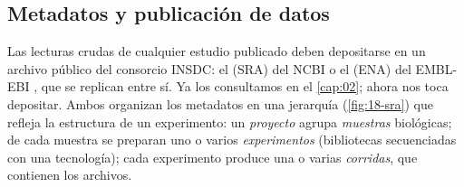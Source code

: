 \subsection{Metadatos y publicación de datos}

Las lecturas crudas de cualquier estudio publicado deben depositarse en un archivo público del consorcio INSDC: el  (SRA) del NCBI \parencite{c18-leinonen2011sra} o el  (ENA) del EMBL-EBI \parencite{c18-leinonen2011ena}, que se replican entre sí. Ya los consultamos en el \cref{cap:02}; ahora nos toca depositar. Ambos organizan los metadatos en una jerarquía (\cref{fig:18-sra}) que refleja la estructura de un experimento: un \emph{proyecto} agrupa \emph{muestras} biológicas; de cada muestra se preparan uno o varios \emph{experimentos} (bibliotecas secuenciadas con una tecnología); cada experimento produce una o varias \emph{corridas}, que contienen los archivos.

